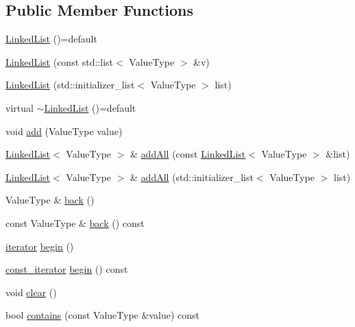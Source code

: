 \subsection*{Public Member Functions}
\begin{DoxyCompactItemize}
\item 
\mbox{\hyperlink{classLinkedList_a1a7a6ed8aa1481e33bcb4f91dda73206}{Linked\+List}} ()=default
\item 
\mbox{\hyperlink{classLinkedList_ae9514892204b457ddde51967b066e772}{Linked\+List}} (const std\+::list$<$ Value\+Type $>$ \&v)
\item 
\mbox{\hyperlink{classLinkedList_ad6d043fd9b28b5547bfdded20547e07b}{Linked\+List}} (std\+::initializer\+\_\+list$<$ Value\+Type $>$ list)
\item 
virtual \mbox{\hyperlink{classLinkedList_a3112225e2c74b4df3327f36e6c34e861}{$\sim$\+Linked\+List}} ()=default
\item 
void \mbox{\hyperlink{classLinkedList_aa6249e9d60956ac91381e5040b77c0c6}{add}} (Value\+Type value)
\item 
\mbox{\hyperlink{classLinkedList}{Linked\+List}}$<$ Value\+Type $>$ \& \mbox{\hyperlink{classLinkedList_a1c99533be0fd8af3d62d3cc41b2ff1cb}{add\+All}} (const \mbox{\hyperlink{classLinkedList}{Linked\+List}}$<$ Value\+Type $>$ \&list)
\item 
\mbox{\hyperlink{classLinkedList}{Linked\+List}}$<$ Value\+Type $>$ \& \mbox{\hyperlink{classLinkedList_ae5de21c6c9261adbe14860d81fa7c984}{add\+All}} (std\+::initializer\+\_\+list$<$ Value\+Type $>$ list)
\item 
Value\+Type \& \mbox{\hyperlink{classLinkedList_a2bad145b40a82c36986f67610313658d}{back}} ()
\item 
const Value\+Type \& \mbox{\hyperlink{classLinkedList_adc761c91bdacd01bed5c96e25fd9486a}{back}} () const
\item 
\mbox{\hyperlink{classLinkedList_a50754c96f45bbb0f50e145fd70de6615}{iterator}} \mbox{\hyperlink{classLinkedList_ad69bd11391be1a1dba5c8202259664f8}{begin}} ()
\item 
\mbox{\hyperlink{classLinkedList_a3b9d37bc4aeea14213d403a3b30a230f}{const\+\_\+iterator}} \mbox{\hyperlink{classLinkedList_a29305669b60ca1680752e2fc3592ba99}{begin}} () const
\item 
void \mbox{\hyperlink{classLinkedList_ac8bb3912a3ce86b15842e79d0b421204}{clear}} ()
\item 
bool \mbox{\hyperlink{classLinkedList_a6fbc1a150987e7e5320d244a3baeb560}{contains}} (const Value\+Type \&value) const

\end{DoxyCompactItemize}
